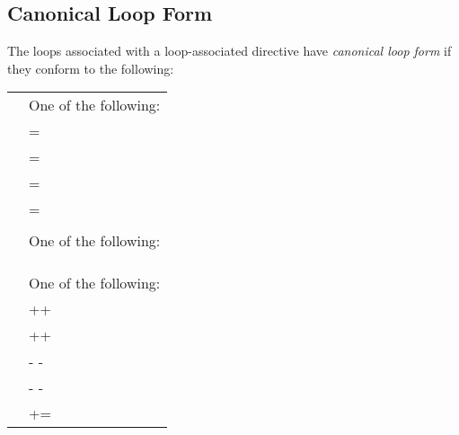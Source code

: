 \subsection{Canonical Loop Form}
\label{subsec:Canonical Loop Form}
\begin{ccppspecific}
The loops associated with a loop-associated directive have \emph{canonical loop form} if
they conform to the following:

\medskip
\nolinenumbers
\renewcommand{\arraystretch}{1.0}
\tablelasttail{\hline}
\begin{supertabular}{ p{0.8in} p{4.5in}}
    {} & One of the following:\\
    & {} = {}\\
    & {} {} = {}\\
    & {} {} = {}\\
    & {} {} = {}\\
    & \\
    {} & One of the following:\\
    & {} {} {}\\
    & {} {} {}\\
    & \\
    {} & One of the following:\\
    & ++{}\\
    & {}++\\
    & {-} {-} {}\\
    & {} {-} {-}\\
    & {} += {}\\

\end{supertabular}
\end{ccppspecific}
